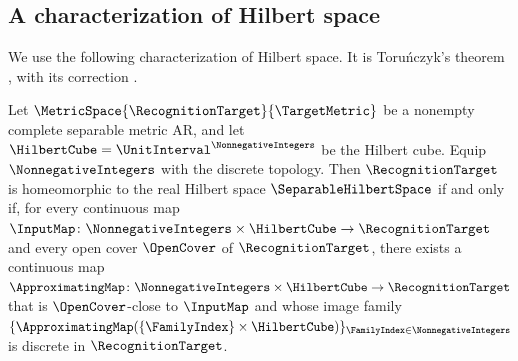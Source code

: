 \subsection{A characterization of Hilbert space}\label{subsec:hilbert-preliminaries-recognition}
We use the following characterization of Hilbert space.
It is Toru\'nczyk's theorem
\cite[p.~248, condition~(i)]{Torunczyk1981},
with its correction
\cite[Section~C]{Torunczyk1985}.

\begin{theorem}\label{thm:torunczyk}
Let
$\MetricSpace{\RecognitionTarget }{\TargetMetric }$
be a nonempty complete separable metric AR,
and let
$\HilbertCube =\UnitInterval^{\NonnegativeIntegers}$
be the Hilbert cube.
Equip
$\NonnegativeIntegers$
with the discrete topology.
Then
$\RecognitionTarget $
is homeomorphic to the real Hilbert space
$\SeparableHilbertSpace$
if and only if,
for every continuous map
$\InputMap \colon \NonnegativeIntegers\times \HilbertCube \to \RecognitionTarget $
and every open cover
$\OpenCover$
of
$\RecognitionTarget $,
there exists a continuous map
$\ApproximatingMap \colon \NonnegativeIntegers\times \HilbertCube \to \RecognitionTarget $
that is
$\OpenCover$-close to
$\InputMap$
and whose image family
$\{\ApproximatingMap (\{\FamilyIndex \}\times \HilbertCube )\}_{\FamilyIndex \in\NonnegativeIntegers}$
is discrete in
$\RecognitionTarget $.
\end{theorem}
